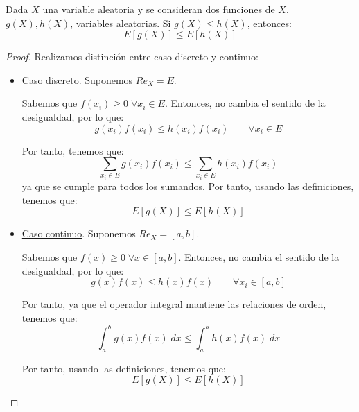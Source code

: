 \begin{prop}
    Dada $X$ una variable aleatoria y se consideran dos funciones de $X$, $g(X), h(X)$, variables aleatorias. Si $g(X)\leq h(X)$, entonces:
    \begin{equation*}
        E[g(X)]\leq E[h(X)]
    \end{equation*}
\end{prop}
\begin{proof}
    Realizamos distinción entre caso discreto y continuo:
    \begin{itemize}
        \item \underline{Caso discreto}. Suponemos $Re_X = E$.

        Sabemos que $f(x_i)\geq 0 \;\forall x_i\in E$. Entonces, no cambia el sentido de la desigualdad, por lo que:
        \begin{equation*}
            g(x_i)f(x_i)\leq h(x_i)f(x_i) \qquad \forall x_i\in E
        \end{equation*}

        Por tanto, tenemos que:
        \begin{equation*}
            \sum_{x_i\in E}g(x_i)f(x_i)\leq \sum_{x_i\in E} h(x_i)f(x_i)
        \end{equation*}
        ya que se cumple para todos los sumandos. Por tanto, usando las definiciones, tenemos que:
        \begin{equation*}
            E[g(X)]\leq E[h(X)]
        \end{equation*}

        \item \underline{Caso continuo}. Suponemos $Re_X = [a,b]$.

        Sabemos que $f(x)\geq 0 \;\forall x\in [a,b]$. Entonces, no cambia el sentido de la desigualdad, por lo que:
        \begin{equation*}
            g(x)f(x)\leq h(x)f(x) \qquad \forall x_i\in [a,b]
        \end{equation*}

        Por tanto, ya que el operador integral mantiene las relaciones de orden, tenemos que:
        \begin{equation*}
            \int_a^b g(x)f(x)\;dx\leq \int_a^b h(x)f(x)\;dx
        \end{equation*}
        
        Por tanto, usando las definiciones, tenemos que:
        \begin{equation*}
            E[g(X)]\leq E[h(X)]
        \end{equation*}
    \end{itemize}
\end{proof}

